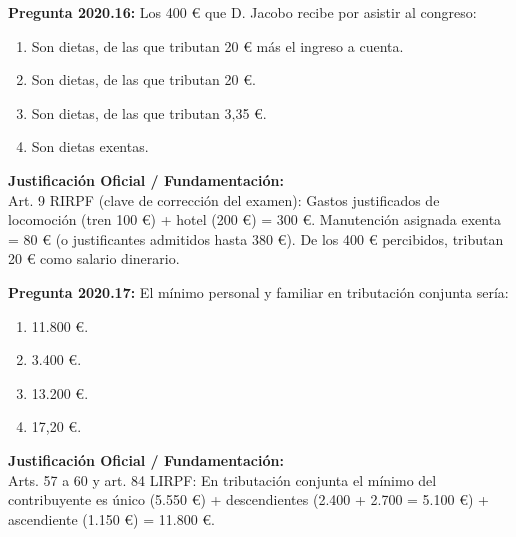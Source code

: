 \documentclass[11pt,a4paper,openany]{article}
\begin{document}
\noindent\textbf{\sffamily Pregunta 2020.16:} Los 400 \euro{} que D. Jacobo recibe por asistir al congreso:\\[0.15cm]
\begin{enumerate}[label=\textbf{\alph*)},leftmargin=1.8em,itemsep=1.5pt,topsep=2pt,partopsep=0pt,parsep=0pt]
    \item Son dietas, de las que tributan 20 \euro{} más el ingreso a cuenta.
    \item Son dietas, de las que tributan 20 \euro{}.
    \item Son dietas, de las que tributan 3,35 \euro{}.
    \item Son dietas exentas.
\end{enumerate}
\begin{solucionBox}
\textbf{Justificación Oficial / Fundamentación:}\\[0.1cm]
Art. 9 RIRPF (clave de corrección del examen): Gastos justificados de locomoción (tren 100 \euro{}) + hotel (200 \euro{}) = 300 \euro{}. Manutención asignada exenta = 80 \euro{} (o justificantes admitidos hasta 380 \euro{}). De los 400 \euro{} percibidos, tributan 20 \euro{} como salario dinerario.
\end{solucionBox}
\vspace{0.35cm}

\noindent\textbf{\sffamily Pregunta 2020.17:} El mínimo personal y familiar en tributación conjunta sería:\\[0.15cm]
\begin{enumerate}[label=\textbf{\alph*)},leftmargin=1.8em,itemsep=1.5pt,topsep=2pt,partopsep=0pt,parsep=0pt]
    \item 11.800 \euro{}.
    \item 3.400 \euro{}.
    \item 13.200 \euro{}.
    \item 17,20 \euro{}.
\end{enumerate}
\begin{solucionBox}
\textbf{Justificación Oficial / Fundamentación:}\\[0.1cm]
Arts. 57 a 60 y art. 84 LIRPF: En tributación conjunta el mínimo del contribuyente es único (5.550 \euro{}) + descendientes (2.400 + 2.700 = 5.100 \euro{}) + ascendiente (1.150 \euro{}) = 11.800 \euro{}.
\end{solucionBox}
\vspace{0.35cm}
\end{document}
